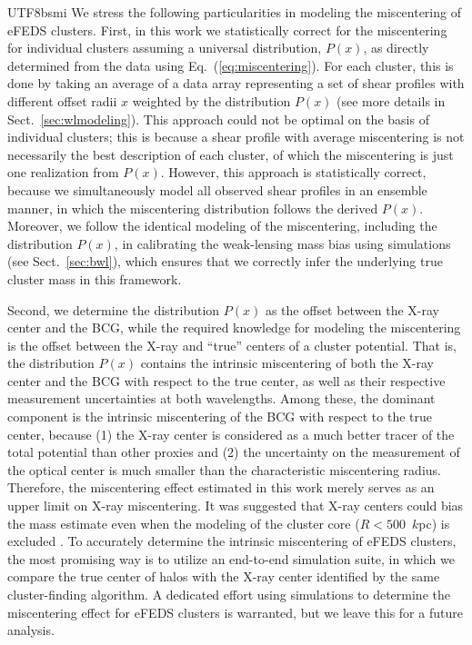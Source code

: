 \documentclass[longauth]{aa}
\begin{document}
\begin{CJK*}{UTF8}{bsmi}
We stress the following particularities in modeling the miscentering of eFEDS clusters.
First, in this work we statistically correct for the miscentering for individual clusters assuming a universal distribution, $P(x)$, as directly determined from the data using Eq.~(\ref{eq:miscentering}).
For each cluster, this is done by taking an average of a data array representing a set of shear profiles with different offset radii $x$ weighted by the distribution $P(x)$ (see more details in Sect.~\ref{sec:wlmodeling}).
This approach could not be optimal on the basis of individual clusters; 
this is because a shear profile with average miscentering is not necessarily the best description of each cluster, of which the miscentering is just one realization from $P(x)$.
However, this approach is statistically correct, because we simultaneously model all observed shear profiles in an ensemble manner, in which the miscentering distribution follows the derived $P(x)$.
Moreover, we follow the identical modeling of the miscentering, including the distribution $P(x)$, in calibrating the weak-lensing mass bias using simulations (see Sect.~\ref{sec:bwl}), which ensures that we correctly infer the underlying true cluster mass in this framework.


Second, we determine the distribution $P(x)$ as the offset between the X-ray center and the BCG, while the required knowledge for modeling the miscentering is the offset between the X-ray  and ``true'' centers of a cluster potential.
That is, the distribution $P(x)$ contains the intrinsic miscentering of both the X-ray center and the BCG with respect to the true center, as well as their respective measurement uncertainties  at both wavelengths.
Among these, the dominant component is the intrinsic miscentering of the BCG with respect to the true center, because (1) the X-ray center is considered as a much better tracer of the total potential than other proxies \citep{lin04b, mahdavi13, lauer14, zhang19} and (2) 
the uncertainty on the measurement  of the optical center is much smaller than the characteristic miscentering radius. 
Therefore, the miscentering effect estimated in this work merely serves as an upper limit on X-ray miscentering.
It was suggested that X-ray centers could bias the mass estimate even when the modeling of the cluster core ($R<500$~$k$pc) is excluded \citep[][]{schrabback21}.
To accurately determine the intrinsic miscentering of eFEDS clusters, the most promising way is to utilize an end-to-end simulation suite, in which we compare the true center of halos with the X-ray center identified by the same cluster-finding algorithm.
A dedicated effort using simulations to determine the miscentering effect for eFEDS clusters is warranted, but we leave this for a future analysis.



\end{CJK*}
\end{document}
